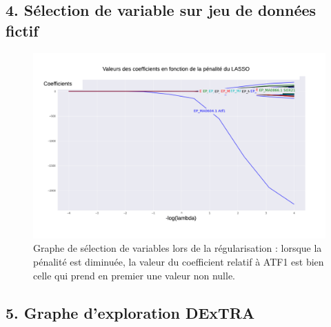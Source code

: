 \documentclass[french]{llncs}
\begin{document}
\clearpage
\subsection*{4. Sélection de variable sur jeu de données fictif}


\begin{figure}[h]
\begin{center}
 	\includegraphics[width=1\linewidth]{Images_FANTOM/Lasso_path_fictive.png}
 \caption{Graphe de sélection de variables lors de la régularisation : lorsque la pénalité est diminuée, la valeur du coefficient relatif à ATF1 est bien celle qui prend en premier une valeur non nulle.} \label{fig:fictif}
\end{center}
\end{figure}

\newpage

\subsection*{5. Graphe d'exploration DExTRA}
\end{document}
